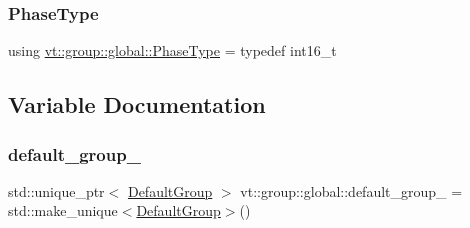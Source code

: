 \subsubsection{\texorpdfstring{Phase\+Type}{PhaseType}}
{\footnotesize\ttfamily using \hyperlink{namespacevt_1_1group_1_1global_a1ad2576a1029e469969bdcd577122ee3}{vt\+::group\+::global\+::\+Phase\+Type} = typedef int16\+\_\+t}



\subsection{Variable Documentation}
\mbox{\label{namespacevt_1_1group_1_1global_a7b35a98031034bd9b2f6837a6b089c39}} 
\subsubsection{\texorpdfstring{default\+\_\+group\+\_\+}{default\_group\_}}
{\footnotesize\ttfamily std\+::unique\+\_\+ptr$<$ \hyperlink{structvt_1_1group_1_1global_1_1_default_group}{Default\+Group} $>$ vt\+::group\+::global\+::default\+\_\+group\+\_\+ = std\+::make\+\_\+unique$<$\hyperlink{structvt_1_1group_1_1global_1_1_default_group}{Default\+Group}$>$()}

